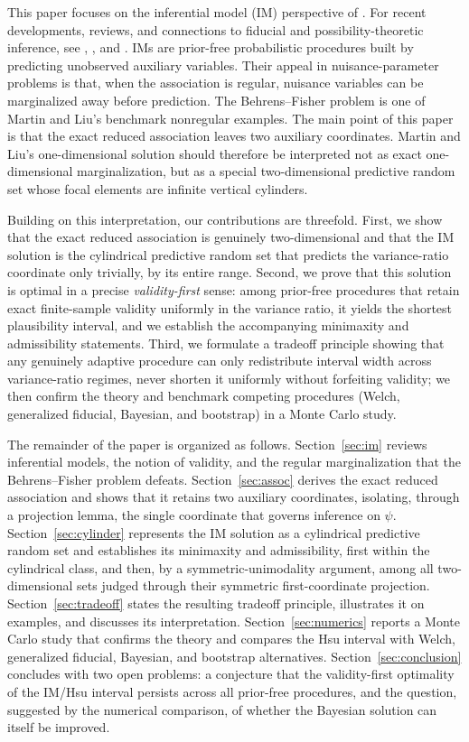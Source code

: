 \documentclass[12pt]{article}
\begin{document}
This paper focuses on the inferential model (IM) perspective of
\citet{MartinLiu2013,MartinLiu2015Marginal,MartinLiu2015Book}.  For recent
developments, reviews, and connections to fiducial and possibility-theoretic
inference, see \citet{CuiHannig2026}, \citet{Martin2026Review}, and
\citet{Martin2026reIMagine}.  IMs are
prior-free probabilistic procedures built by predicting unobserved auxiliary
variables.  Their appeal in nuisance-parameter problems is that, when the
association is regular, nuisance variables can be marginalized away before
prediction.  The Behrens--Fisher problem is one of Martin and Liu's benchmark
nonregular examples.  The main point of this paper is that the exact reduced
association leaves two auxiliary coordinates.  Martin and Liu's
one-dimensional solution should therefore be interpreted not as exact
one-dimensional marginalization, but as a special two-dimensional predictive
random set whose focal elements are infinite vertical cylinders.

Building on this interpretation, our contributions are threefold.  First, we show
that the exact reduced association is genuinely two-dimensional and that the IM
solution is the cylindrical predictive random set that predicts the variance-ratio
coordinate only trivially, by its entire range.  Second, we prove that this
solution is optimal in a precise \emph{validity-first} sense: among prior-free
procedures that retain exact finite-sample validity uniformly in the variance
ratio, it yields the shortest plausibility interval, and we establish the
accompanying minimaxity and admissibility statements.  Third, we formulate a
tradeoff principle showing that any genuinely adaptive procedure can only
redistribute interval width across variance-ratio regimes, never shorten it
uniformly without forfeiting validity; we then confirm the theory and benchmark
competing procedures (Welch, generalized fiducial, Bayesian, and bootstrap) in a
Monte Carlo study.

The remainder of the paper is organized as follows.
Section~\ref{sec:im} reviews inferential models, the notion of validity, and the
regular marginalization that the Behrens--Fisher problem defeats.
Section~\ref{sec:assoc} derives the exact reduced association and shows that it
retains two auxiliary coordinates, isolating, through a projection lemma, the
single coordinate that governs inference on \(\psi\).  Section~\ref{sec:cylinder}
represents the IM solution as a cylindrical predictive random set and
establishes its minimaxity and admissibility, first within the cylindrical
class, and then, by a symmetric-unimodality argument, among all two-dimensional
sets judged through their symmetric first-coordinate projection.
Section~\ref{sec:tradeoff} states the resulting tradeoff principle, illustrates it
on examples, and discusses its interpretation.  Section~\ref{sec:numerics}
reports a Monte Carlo study that confirms the theory and compares the Hsu
interval with Welch, generalized fiducial, Bayesian, and bootstrap alternatives.
Section~\ref{sec:conclusion} concludes with two open problems: a conjecture that
the validity-first optimality of the IM/Hsu interval persists across all
prior-free procedures, and the question, suggested by the numerical comparison, of
whether the Bayesian solution can itself be improved.
\end{document}

